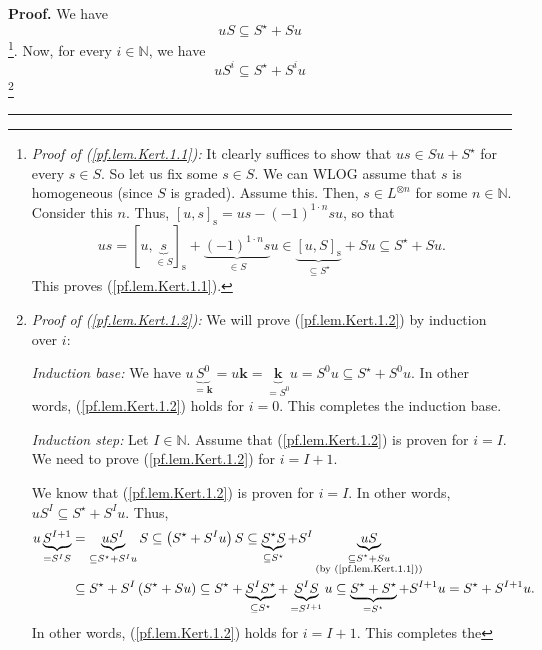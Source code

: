 \documentclass[numbers=enddot,12pt,final,onecolumn,notitlepage]{scrartcl}%
\theoremstyle{definition}
\newenvironment{proof}[1][Proof]{\noindent\textbf{#1.} }{\ \rule{0.5em}{0.5em}}
\begin{document}
\begin{proof}
We have%
\begin{equation}
uS\subseteq S^{\star}+Su \label{pf.lem.Kert.1.1}%
\end{equation}
\footnote{\textit{Proof of (\ref{pf.lem.Kert.1.1}):} It clearly suffices to
show that $us\in Su+S^{\star}$ for every $s\in S$. So let us fix some $s\in
S$. We can WLOG assume that $s$ is homogeneous (since $S$ is graded). Assume
this. Then, $s\in L^{\otimes n}$ for some $n\in\mathbb{N}$. Consider this $n$.
Thus, $\left[  u,s\right]  _{\operatorname*{s}}=us-\left(  -1\right)  ^{1\cdot
n}su$, so that%
\[
us=\left[  u,\underbrace{s}_{\in S}\right]  _{\operatorname*{s}}%
+\underbrace{\left(  -1\right)  ^{1\cdot n}s}_{\in S}u\in\underbrace{\left[
u,S\right]  _{\operatorname*{s}}}_{\subseteq S^{\star}}+Su\subseteq S^{\star
}+Su.
\]
This proves (\ref{pf.lem.Kert.1.1}).}. Now, for every $i\in\mathbb{N}$, we
have%
\begin{equation}
uS^{i}\subseteq S^{\star}+S^{i}u \label{pf.lem.Kert.1.2}%
\end{equation}
\footnote{\textit{Proof of (\ref{pf.lem.Kert.1.2}):} We will prove
(\ref{pf.lem.Kert.1.2}) by induction over $i$:
\par
\textit{Induction base:} We have $u\underbrace{S^{0}}_{=\mathbf{k}%
}=u\mathbf{k}=\underbrace{\mathbf{k}}_{=S^{0}}u=S^{0}u\subseteq S^{\star
}+S^{0}u$. In other words, (\ref{pf.lem.Kert.1.2}) holds for $i=0$. This
completes the induction base.
\par
\textit{Induction step:} Let $I\in\mathbb{N}$. Assume that
(\ref{pf.lem.Kert.1.2}) is proven for $i=I$. We need to prove
(\ref{pf.lem.Kert.1.2}) for $i=I+1$.
\par
We know that (\ref{pf.lem.Kert.1.2}) is proven for $i=I$. In other words,
$uS^{I}\subseteq S^{\star}+S^{I}u$. Thus,%
\begin{align*}
u\underbrace{S^{I+1}}_{=S^{I}S}  &  =\underbrace{uS^{I}}_{\subseteq S^{\star
}+S^{I}u}S\subseteq\left(  S^{\star}+S^{I}u\right)  S\subseteq
\underbrace{S^{\star}S}_{\subseteq S^{\star}}+S^{I}\underbrace{uS}%
_{\substack{\subseteq S^{\star}+Su\\\text{(by (\ref{pf.lem.Kert.1.1}))}}}\\
&  \subseteq S^{\star}+S^{I}\left(  S^{\star}+Su\right)  \subseteq S^{\star
}+\underbrace{S^{I}S^{\star}}_{\subseteq S^{\star}}+\underbrace{S^{I}%
S}_{=S^{I+1}}u\subseteq\underbrace{S^{\star}+S^{\star}}_{=S^{\star}}%
+S^{I+1}u=S^{\star}+S^{I+1}u.
\end{align*}
In other words, (\ref{pf.lem.Kert.1.2}) holds for $i=I+1$. This completes the
}
\end{proof}
\end{document}
